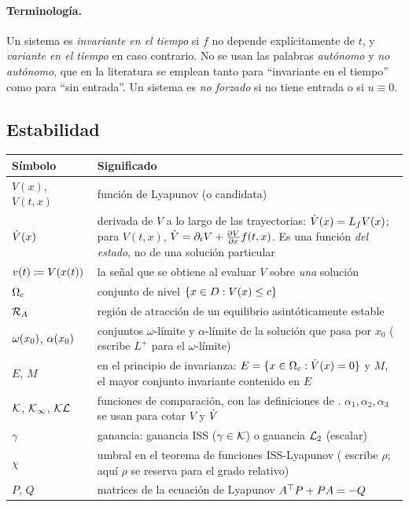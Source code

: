 \paragraph{Terminología.} Un sistema es \emph{invariante en el tiempo} si $f$ no depende explícitamente de $t$, y \emph{variante en el tiempo} en caso contrario. No se usan las palabras \emph{autónomo} y \emph{no autónomo}, que en la literatura se emplean tanto para ``invariante en el tiempo'' como para ``sin entrada''. Un sistema es \emph{no forzado} si no tiene entrada o si $u\equiv0$.

\subsection*{Estabilidad}


\small
\begin{tabular}{@{}>{\raggedright\arraybackslash}p{3.0cm}>{\raggedright\arraybackslash}p{9.5cm}@{}}
\toprule
Símbolo & Significado \\
\midrule
$V(x)$, $V(t,x)$ & función de Lyapunov (o candidata) \\
$\dot V(x)$ & derivada de $V$ a lo largo de las trayectorias: $\dot V(x)=L_{f}V(x)$; para $V(t,x)$, $\dot V=\partial_tV+\frac{\partial V}{\partial x}f(t,x)$. Es una función \emph{del estado}, no de una solución particular \\
$v(t)\coloneqq V(x(t))$ & la señal que se obtiene al evaluar $V$ sobre \emph{una} solución \\
$\Omega_{c}$ & conjunto de nivel $\{x\in D:V(x)\le c\}$ \\
$\mathcal{R}_A$ & región de atracción de un equilibrio asintóticamente estable \\
$\omega(x_0)$, $\alpha(x_0)$ & conjuntos $\omega$-límite y $\alpha$-límite de la solución que pasa por $x_0$ (\citet{Kha02} escribe $L^+$ para el $\omega$-límite) \\
$E$, $M$ & en el principio de invarianza: $E=\{x\in\Omega_{c}:\dot V(x)=0\}$ y $M$, el mayor conjunto invariante contenido en $E$ \\
$\mathcal{K}$, $\mathcal{K}_{\infty}$, $\mathcal{KL}$ & funciones de comparación, con las definiciones de \citet{Kha02}. $\alpha_1,\alpha_2,\alpha_3$ se usan para cotar $V$ y $\dot V$ \\
$\gamma$ & ganancia: ganancia ISS ($\gamma\in\mathcal{K}$) o ganancia $\mathcal{L}_{2}$ (escalar) \\
$\chi$ & umbral en el teorema de funciones ISS-Lyapunov (\citet{Kha02} escribe $\rho$; aquí $\rho$ se reserva para el grado relativo) \\
$P$, $Q$ & matrices de la ecuación de Lyapunov $A^{\top} P+PA=-Q$ \\
\bottomrule
\end{tabular}


